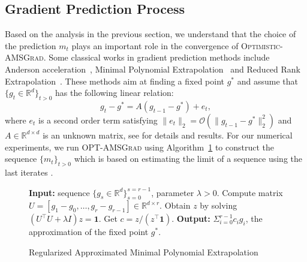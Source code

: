 \documentclass[wcp]{jmlr}
\begin{document}
\subsection{Gradient Prediction Process}

Based on the analysis in the previous section, we understand that the choice of the prediction $m_t$ plays an important role in the convergence of \textsc{Optimistic-AMSGrad}.
Some classical works in gradient prediction methods include Anderson acceleration~\citep{WN11}, Minimal Polynomial Extrapolation~\citep{CJ76} and Reduced Rank Extrapolation~\citep{E79}.
These methods aim at finding a fixed point $g^{*}$ and assume that $\{g_t \in \mathbb R^d\}_{t>0} $ has the following linear relation:
\begin{equation} \label{nox}
g_t - g^* = A( g_{t-1} - g^* ) + e_t,
\end{equation}
where $e_t$ is a second order term satisfying $\| e_t \|_2  = \mathcal{O}( \| g_{t-1} - g^* \|_2^2)$ and $A \in \mathbb R^{d \times d}$ is an unknown matrix, see \citet{SAB16} for details and results.
For our numerical experiments, we run \textsc{OPT-AMSGrad} using Algorithm~\ref{alg:algex} to construct the sequence $\{m_t\}_{t>0}$ which is based on estimating the limit of a sequence using the last iterates \citep{BZ13}.



\begin{figure}\vspace{-0.3in}
\begin{minipage}{\linewidth}
\begin{algorithm}[H]
\begin{algorithmic}[1] 
\small
\caption{Regularized Approximated Minimal Polynomial Extrapolation \citep{SAB16} } \label{alg:algex}
\STATE \textbf{Input:} sequence $\{ g_s \in \mathbb R^d \}_{s=0}^{s=r-1}$, parameter $\lambda > 0$.
\STATE Compute matrix  $U = [ g_1 - g_0, \dots, g_{r} - g_{r-1}] \in \mathbb R^{d \times r}$.
\STATE Obtain $z$ by solving $(U^\top U + \lambda I ) z = \mathbf{1}$.
\STATE Get $c= z / (z^\top \mathbf{1})$.
\STATE \textbf{Output:} $\Sigma_{i=0}^{r-1} c_i g_i$, the approximation of the fixed point $g^*$.
\end{algorithmic}
\end{algorithm}
\end{minipage}\end{figure}
\end{document}
